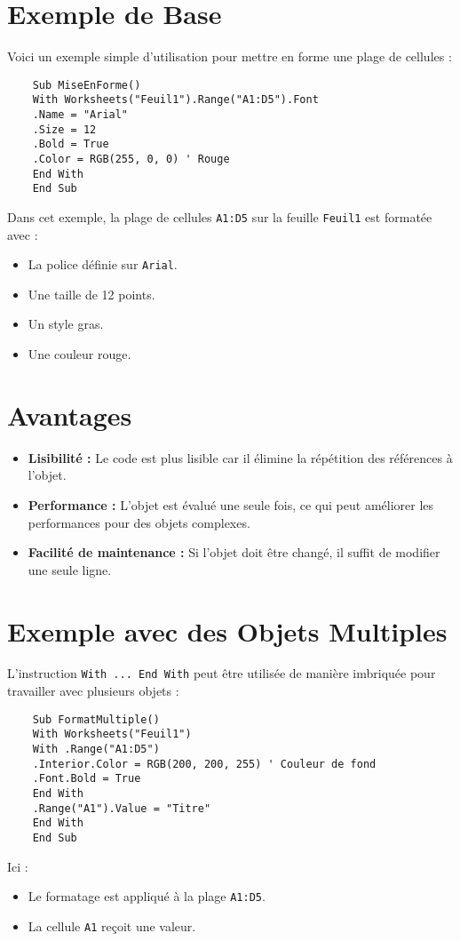\documentclass[a4paper,12pt]{report}
\begin{document}
\section{Exemple de Base}
Voici un exemple simple d'utilisation pour mettre en forme une plage de cellules :
\begin{lstlisting}
	Sub MiseEnForme()
	With Worksheets("Feuil1").Range("A1:D5").Font
	.Name = "Arial"
	.Size = 12
	.Bold = True
	.Color = RGB(255, 0, 0) ' Rouge
	End With
	End Sub
\end{lstlisting}

Dans cet exemple, la plage de cellules \texttt{A1:D5} sur la feuille \texttt{Feuil1} est formatée avec :
\begin{itemize}
	\item La police définie sur \texttt{Arial}.
	\item Une taille de 12 points.
	\item Un style gras.
	\item Une couleur rouge.
\end{itemize}

\section{Avantages}
\begin{itemize}
	\item \textbf{Lisibilité :} Le code est plus lisible car il élimine la répétition des références à l'objet.
	\item \textbf{Performance :} L'objet est évalué une seule fois, ce qui peut améliorer les performances pour des objets complexes.
	\item \textbf{Facilité de maintenance :} Si l'objet doit être changé, il suffit de modifier une seule ligne.
\end{itemize}
\newpage
\section{Exemple avec des Objets Multiples}
L'instruction \texttt{With ... End With} peut être utilisée de manière imbriquée pour travailler avec plusieurs objets :
\begin{lstlisting}
	Sub FormatMultiple()
	With Worksheets("Feuil1")
	With .Range("A1:D5")
	.Interior.Color = RGB(200, 200, 255) ' Couleur de fond
	.Font.Bold = True
	End With
	.Range("A1").Value = "Titre"
	End With
	End Sub
\end{lstlisting}

Ici :
\begin{itemize}
	\item Le formatage est appliqué à la plage \texttt{A1:D5}.
	\item La cellule \texttt{A1} reçoit une valeur.
\end{itemize}
\end{document}
